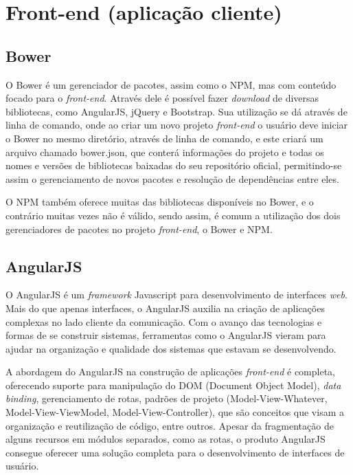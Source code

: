 \section{Front-end (aplicação cliente)}

\subsection{Bower}
O Bower \cite{bower} é um gerenciador de pacotes, assim como o NPM, mas com conteúdo focado para o \textit{front-end}. Através dele é possível fazer \textit{download} de diversas bibliotecas, como AngularJS, jQuery e Bootstrap. Sua utilização se dá através de linha de comando, onde ao criar um novo projeto \textit{front-end} o usuário deve iniciar o Bower no mesmo diretório, através de linha de comando, e este criará um arquivo chamado bower.json, que conterá informações do projeto e todas os nomes e versões de bibliotecas baixadas do seu repositório oficial, permitindo-se assim o gerenciamento de novos pacotes e resolução de dependências entre eles.

O NPM também oferece muitas das bibliotecas disponíveis no Bower, e o contrário muitas vezes não é válido, sendo assim, é comum a utilização dos dois gerenciadores de pacotes no projeto \textit{front-end}, o Bower e NPM.

\subsection{AngularJS}
O AngularJS \cite{angular} é um \textit{framework} Javascript para desenvolvimento de interfaces \textit{web}. Mais do que apenas interfaces, o AngularJS auxilia na criação de aplicações complexas no lado cliente da comunicação. Com o avanço das tecnologias e formas de se construir sistemas, ferramentas como o AngularJS vieram para ajudar na organização e qualidade dos sistemas que estavam se desenvolvendo.

A abordagem do AngularJS na construção de aplicações \textit{front-end} é completa, oferecendo suporte para manipulação do DOM (Document Object Model), \textit{data binding}, gerenciamento de rotas, padrões de projeto (Model-View-Whatever, Model-View-ViewModel, Model-View-Controller), que são conceitos que visam a organização e reutilização de código, entre outros. Apesar da fragmentação de alguns recursos em módulos separados, como as rotas, o produto AngularJS consegue oferecer uma solução completa para o desenvolvimento de interfaces de usuário.

